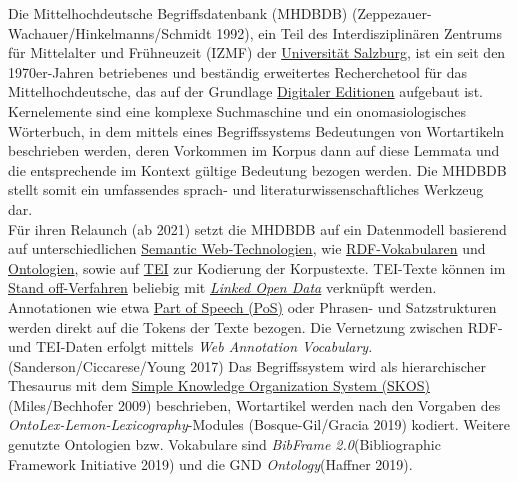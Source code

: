 \documentclass{article}
\begin{document}
    Die Mittelhochdeutsche Begriffsdatenbank (MHDBDB)
                     (Zeppezauer-Wachauer/Hinkelmanns/Schmidt 1992), ein Teil des
                  Interdisziplinären Zentrums für Mittelalter und Frühneuzeit (IZMF) der \href{http://gams.uni-graz.at/o:konde.203}{Universität Salzburg}, ist ein seit
                  den 1970er-Jahren betriebenes und beständig erweitertes Recherchetool für das
                  Mittelhochdeutsche, das auf der Grundlage \href{http://gams.uni-graz.at/o:konde.59}{Digitaler Editionen} aufgebaut ist. Kernelemente sind
                  eine komplexe Suchmaschine und ein onomasiologisches Wörterbuch, in dem mittels
                  eines Begriffssystems Bedeutungen von Wortartikeln beschrieben werden, deren
                  Vorkommen im Korpus dann auf diese Lemmata und die entsprechende im Kontext
                  gültige Bedeutung bezogen werden. Die MHDBDB stellt somit ein umfassendes sprach-
                  und literaturwissenschaftliches Werkzeug dar.\\
            
        Für ihren Relaunch (ab 2021) setzt die MHDBDB auf ein Datenmodell basierend auf
                  unterschiedlichen \href{http://gams.uni-graz.at/o:konde.168}{Semantic Web-Technologien}, wie \href{http://gams.uni-graz.at/o:konde.131}{RDF-Vokabularen} und \href{http://gams.uni-graz.at/o:konde.151}{Ontologien}, sowie auf \href{http://gams.uni-graz.at/o:konde.178}{TEI} zur Kodierung der Korpustexte. TEI-Texte können
                  im \href{http://gams.uni-graz.at/o:konde.171}{Stand
                     off-Verfahren} beliebig mit \emph{\href{http://gams.uni-graz.at/o:konde.8}{Linked Open Data}} verknüpft werden. Annotationen wie etwa \href{http://gams.uni-graz.at/o:konde.156}{Part of Speech (PoS)} oder
                  Phrasen- und Satzstrukturen werden direkt auf die Tokens der Texte bezogen. Die
                  Vernetzung zwischen RDF- und TEI-Daten erfolgt mittels \emph{Web
                     Annotation Vocabulary.}(Sanderson/Ciccarese/Young 2017) Das Begriffssystem wird als
                  hierarchischer Thesaurus mit dem \href{http://gams.uni-graz.at/o:konde.132}{Simple Knowledge Organization System (SKOS)}(Miles/Bechhofer 2009) beschrieben, Wortartikel werden nach den
                  Vorgaben des \emph{OntoLex-Lemon-Lexicography}-Modules
                     (Bosque-Gil/Gracia 2019) kodiert. Weitere genutzte Ontologien bzw.
                  Vokabulare sind \emph{BibFrame 2.0}(Bibliographic Framework Initiative 2019) und die GND \emph{Ontology}(Haffner 2019).\\
            
\end{document}
